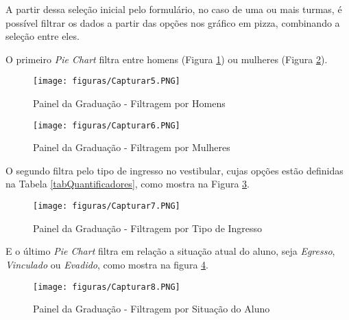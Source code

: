 \documentclass[cic,tc]{iiufrgs}
\begin{document}
A partir dessa seleção inicial pelo formulário, no caso de uma ou mais turmas, é possível filtrar os dados a partir das opções nos gráfico em pizza, combinando a seleção entre eles.

O primeiro \textit{Pie Chart} filtra entre homens (Figura \ref{fig:painelGradHomem}) ou mulheres (Figura \ref{fig:painelGradMullher}).

\begin{figure} [!ht]
        \caption{Painel da Graduação - Filtragem por Homens}
        \begin{center}
            \texttt{[image: figuras/Capturar5.PNG]}
        \end{center}
        
        \label{fig:painelGradHomem}
    \end{figure}

\begin{figure} [!ht]
        \caption{Painel da Graduação - Filtragem por Mulheres}
        \begin{center}
            \texttt{[image: figuras/Capturar6.PNG]}
        \end{center}
        
        \label{fig:painelGradMullher}
    \end{figure}


O segundo filtra pelo tipo de ingresso no vestibular, cujas opções estão definidas na Tabela \ref{tabQuantificadores},  como mostra na Figura \ref{fig:painelGradFiltroIngr}.

\begin{figure} [!ht]
        \caption{Painel da Graduação - Filtragem por Tipo de Ingresso}
        \begin{center}
            \texttt{[image: figuras/Capturar7.PNG]}
        \end{center}
        
        \label{fig:painelGradFiltroIngr}
    \end{figure}

E o último \textit{Pie Chart} filtra em relação a situação atual do aluno, seja \textit{Egresso}, \textit{Vinculado} ou \textit{Evadido}, como mostra na figura \ref{fig:painelFiltroAluno}.

\begin{figure} [!ht]
        \caption{Painel da Graduação - Filtragem por Situação do Aluno}
        \begin{center}
            \texttt{[image: figuras/Capturar8.PNG]}
        \end{center}
        
        \label{fig:painelFiltroAluno}
    \end{figure}
\end{document}
